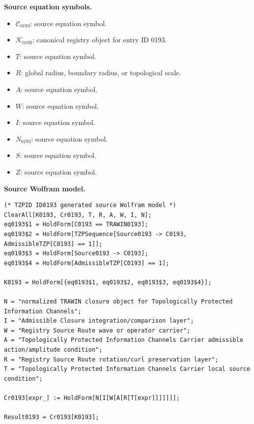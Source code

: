 \begin{minipage}[t]{0.49\linewidth}
\begingroup
\small
\raggedright
\textbf{Source equation symbols.}\par
\begin{itemize}[leftmargin=1.35em,itemsep=1pt,topsep=1pt,parsep=0pt]
    \item $\mathcal{C}_{0193}$: source equation symbol.
    \item $\mathcal{K}_{0193}$: canonical registry object for entry ID 0193.
    \item $T$: source equation symbol.
    \item $R$: global radius, boundary radius, or topological scale.
    \item $A$: source equation symbol.
    \item $W$: source equation symbol.
    \item $I$: source equation symbol.
    \item $N_{0193}$: source equation symbol.
    \item $S$: source equation symbol.
    \item $Z$: source equation symbol.
\end{itemize}
\endgroup
\end{minipage}\hfill
\begin{minipage}[t]{0.47\linewidth}
\begingroup
\scriptsize
\raggedright
\textbf{Source Wolfram model.}\par
\begin{Verbatim}[fontsize=\tiny,breaklines=true,breakanywhere=true]
(* TZPID ID0193 generated source Wolfram model *)
ClearAll[K0193, Cr0193, T, R, A, W, I, N];
eq0193$1 = HoldForm[C0193 == TRAWIN0193];
eq0193$2 = HoldForm[TZPSequence[Source0193 -> C0193, AdmissibleTZP[C0193] == 1]];
eq0193$3 = HoldForm[Source0193 -> C0193];
eq0193$4 = HoldForm[AdmissibleTZP[C0193] == 1];

K0193 = HoldForm[{eq0193$1, eq0193$2, eq0193$3, eq0193$4}];

N = "normalized TRAWIN closure object for Topologically Protected Information Channels";
I = "Admissible Closure integration/comparison layer";
W = "Registry Source Route wave or operator carrier";
A = "Topologically Protected Information Channels Carrier admissible action/amplitude condition";
R = "Registry Source Route rotation/curl preservation layer";
T = "Topologically Protected Information Channels Carrier local source condition";

Cr0193[expr_] := HoldForm[N[I[W[A[R[T[expr]]]]]]];

Result0193 = Cr0193[K0193];
\end{Verbatim}
\endgroup
\end{minipage}

